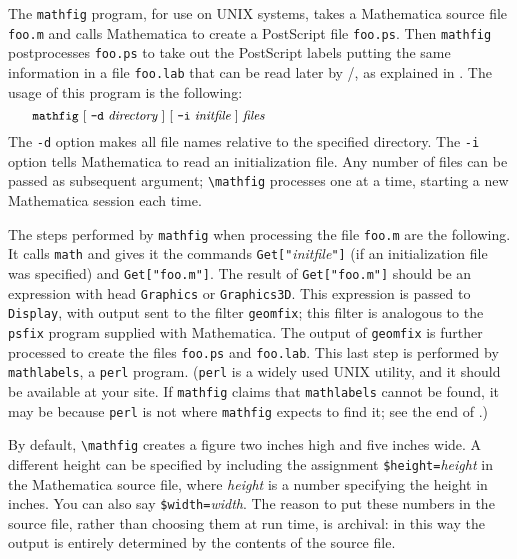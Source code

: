 The \verb+mathfig+ program, for use on UNIX systems, takes a
Mathematica source file \verb+foo.m+ and calls Mathematica to create
a PostScript file \verb+foo.ps+.  
Then \verb+mathfig+ postprocesses \verb+foo.ps+ to
take out the PostScript labels putting the same information in a file
\verb+foo.lab+ that can be read later by \latex/, as explained in
.  The usage of this program is the following:
$$
\hbox to \hsize{\small\hskip 1em
{\tt mathfig} [ {\tt -d} {\it directory} ] [ {\tt -i} {\it initfile} ]
{\it files}\hfil}
$$
The \verb+-d+ option makes all file names relative to the specified
directory.  The \verb+-i+ option tells Mathematica to read an
initialization file.  Any number of files can be passed as subsequent
argument; \verb+\mathfig+ processes one at a time, starting a new
Mathematica session each time.

The steps performed by \verb+mathfig+ when processing the file
\verb+foo.m+ are the following.  It calls \verb+math+ and gives it the
commands \verb+Get["+{\it initfile}\verb+"]+ (if an initialization
file was specified) and \verb+Get["foo.m"]+.  The result of
\verb+Get["foo.m"]+ should be an expression with head \verb+Graphics+
or \verb+Graphics3D+.  This expression is passed to \verb+Display+,
with output sent to the filter \verb+geomfix+; this filter is
analogous to the \verb+psfix+ program supplied with Mathematica.  The
output of \verb+geomfix+ is further processed to create the files
\verb+foo.ps+ and \verb+foo.lab+.  This last step is performed by
\verb+mathlabels+, a \verb+perl+ program.  (\verb+perl+ is a widely
used UNIX utility, and it should be available at your site. If
\verb+mathfig+ claims that \verb+mathlabels+ cannot be found, it may
be because \verb+perl+ is not where \verb+mathfig+ expects to find it;
see the end of .)

By default, \verb+\mathfig+ creates a figure two inches high and five
inches wide.  A different height can be specified by including the
assignment \verb+$height=+{\it height} in the Mathematica source file,
where {\it height} is a number specifying the height in inches.  You
can also say \verb+$width=+{\it width}.  The reason to put these numbers
in the source file, rather than choosing them at run time, is
archival: in this way the output is entirely determined by the
contents of the source file.

